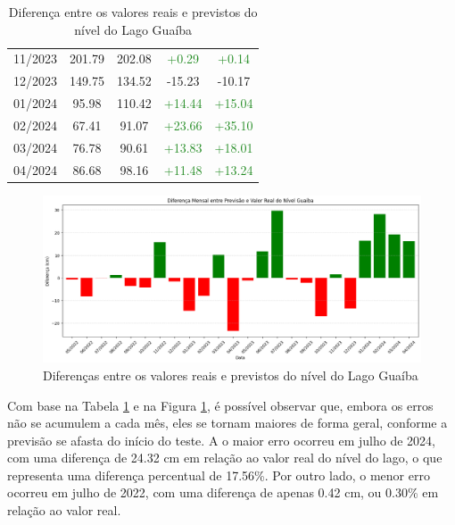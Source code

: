 \begin{table}[H]
\begin{tabular}{|c|c|c|c|c|}
11/2023 & 201.79 & 202.08 & \textcolor{ForestGreen}{+0.29} & \textcolor{ForestGreen}{+0.14} \\
12/2023 & 149.75 & 134.52 & \textcolor{BrickRed}{-15.23} & \textcolor{BrickRed}{-10.17} \\
01/2024 & 95.98 & 110.42 & \textcolor{ForestGreen}{+14.44} & \textcolor{ForestGreen}{+15.04} \\
02/2024 & 67.41 & 91.07 & \textcolor{ForestGreen}{+23.66} & \textcolor{ForestGreen}{+35.10} \\
03/2024 & 76.78 & 90.61 & \textcolor{ForestGreen}{+13.83} & \textcolor{ForestGreen}{+18.01} \\
04/2024 & 86.68 & 98.16 & \textcolor{ForestGreen}{+11.48} & \textcolor{ForestGreen}{+13.24} \\
\hline
\end{tabular}
\caption{Diferença entre os valores reais e previstos do nível do Lago Guaíba}
\label{tab:monthly_summary}
\end{table}

\begin{figure}[H]
	\caption{\label{fig:diferencas_previsao_lago_guaiba}Diferenças entre os valores reais e previstos do nível do Lago Guaíba}
	\begin{center}
		\includegraphics[scale=0.44]{figuras/diferencas_previsao_lago_guaiba.png}
	\end{center}
\end{figure}

Com base na Tabela \ref{tab:monthly_summary} e na Figura \ref{fig:diferencas_previsao_lago_guaiba}, é possível observar que, embora os erros não se acumulem a cada mês, eles se tornam maiores de forma geral, conforme a previsão se afasta do início do teste. A o maior erro ocorreu em julho de 2024, com uma diferença de 24.32 cm em relação ao valor real do nível do lago, o que representa uma diferença percentual de 17.56\%. Por outro lado, o menor erro ocorreu em julho de 2022, com uma diferença de apenas 0.42 cm, ou 0.30\% em relação ao valor real.

